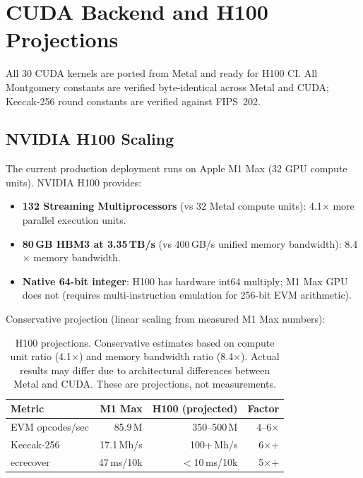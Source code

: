 \section{CUDA Backend and H100 Projections}

\label{sec:future}

All 30 CUDA kernels are ported from Metal and ready for H100 CI. All Montgomery constants
are verified byte-identical across Metal and CUDA; Keccak-256 round constants are verified
against FIPS~202.

\subsection{NVIDIA H100 Scaling}

The current production deployment runs on Apple M1 Max (32 GPU compute units).
NVIDIA H100 provides:

\begin{itemize}
\item \textbf{132 Streaming Multiprocessors} (vs 32 Metal compute units): 4.1$\times$ more
      parallel execution units.
\item \textbf{80\,GB HBM3 at 3.35\,TB/s} (vs 400\,GB/s unified memory bandwidth):
      8.4$\times$ memory bandwidth.
\item \textbf{Native 64-bit integer}: H100 has hardware int64 multiply; M1 Max GPU does not
      (requires multi-instruction emulation for 256-bit EVM arithmetic).
\end{itemize}

Conservative projection (linear scaling from measured M1 Max numbers):

\begin{table}[h]
\centering
\small
\begin{tabular}{lrrr}
\toprule
\textbf{Metric} & \textbf{M1 Max} & \textbf{H100 (projected)} & \textbf{Factor} \\
\midrule
EVM opcodes/sec & 85.9\,M   & 350--500\,M  & 4--6$\times$ \\
Keccak-256      & 17.1\,Mh/s & 100+\,Mh/s  & 6$\times$+ \\
ecrecover       & 47\,ms/10k & $<$10\,ms/10k & 5$\times$+ \\
\bottomrule
\end{tabular}
\caption{H100 projections. Conservative estimates based on compute unit ratio (4.1$\times$)
and memory bandwidth ratio (8.4$\times$). Actual results may differ due to architectural
differences between Metal and CUDA. These are projections, not measurements.}
\label{tab:h100}
\end{table}

